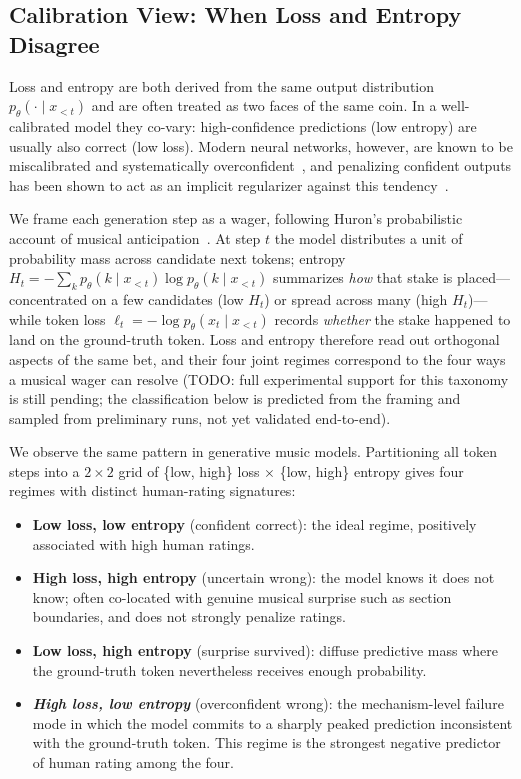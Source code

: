 \documentclass{article}
\begin{document}
\subsection{Calibration View: When Loss and Entropy Disagree}
\label{subsec:calibration}

Loss and entropy are both derived from the same output distribution
$p_\theta(\cdot\mid x_{<t})$ and are often treated as two faces of the same coin.
In a well-calibrated model they co-vary:
high-confidence predictions (low entropy) are usually also correct (low loss).
Modern neural networks, however, are known to be miscalibrated
and systematically overconfident~\cite{guo2017calibration},
and penalizing confident outputs has been shown to act
as an implicit regularizer against this tendency~\cite{pereyra2017confidence}.

We frame each generation step as a wager,
following Huron's probabilistic account of musical anticipation~\cite{huron2006sweet}.
At step $t$ the model distributes a unit of probability mass
across candidate next tokens;
entropy $H_t=-\sum_k p_\theta(k\mid x_{<t})\log p_\theta(k\mid x_{<t})$
summarizes \emph{how} that stake is placed---%
concentrated on a few candidates (low $H_t$) or spread across many (high $H_t$)---%
while token loss $\ell_t=-\log p_\theta(x_t\mid x_{<t})$
records \emph{whether} the stake happened to land on the ground-truth token.
Loss and entropy therefore read out orthogonal aspects of the same bet,
and their four joint regimes correspond to the four ways a musical wager can resolve
(TODO: full experimental support for this taxonomy is still pending;
the classification below is predicted from the framing and sampled
from preliminary runs, not yet validated end-to-end).

We observe the same pattern in generative music models.
Partitioning all token steps into a $2{\times}2$ grid
of \{low, high\} loss $\times$ \{low, high\} entropy
gives four regimes with distinct human-rating signatures:
\begin{itemize}
  \item \textbf{Low loss, low entropy} (confident correct):
    the ideal regime, positively associated with high human ratings.
  \item \textbf{High loss, high entropy} (uncertain wrong):
    the model knows it does not know;
    often co-located with genuine musical surprise
    such as section boundaries, and does not strongly penalize ratings.
  \item \textbf{Low loss, high entropy} (surprise survived):
    diffuse predictive mass where the ground-truth token
    nevertheless receives enough probability.
  \item \textbf{\emph{High loss, low entropy}} (overconfident wrong):
    the mechanism-level failure mode in which the model commits to
    a sharply peaked prediction inconsistent with the ground-truth token.
    This regime is the strongest negative predictor of human rating
    among the four.
\end{itemize}
\end{document}
